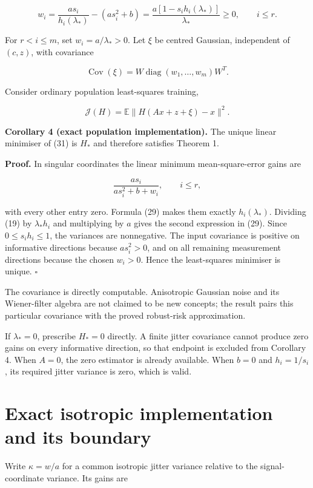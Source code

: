\documentclass[11pt,a4paper]{article}
\begin{document}
\[
w_i=\frac{a s_i}{h_i(\lambda_*)}-(a s_i^2+b)
=\frac{a[1-s_i h_i(\lambda_*)]}{\lambda_*}\ge0,
\qquad i\le r.
\tag{29}
\]

For \(r<i\le m\), set \(w_i=a/\lambda_*>0\). Let \(\xi\) be centred
Gaussian, independent of \((c,z)\), with covariance

\[
\operatorname{Cov}(\xi)=
W\operatorname{diag}(w_1,\ldots,w_m)W^T.
\tag{30}
\]

Consider ordinary population least-squares training,

\[
\mathcal J(H)=\mathbb E\|H(Ax+z+\xi)-x\|^2.
\tag{31}
\]

\textbf{Corollary 4 (exact population implementation).} The unique
linear minimiser of (31) is \(H_*\) and therefore satisfies Theorem 1.

\textbf{Proof.} In singular coordinates the linear minimum
mean-square-error gains are

\[
\frac{a s_i}{a s_i^2+b+w_i},\qquad i\le r,
\]

with every other entry zero. Formula (29) makes them exactly
\(h_i(\lambda_*)\). Dividing (19) by \(\lambda_*h_i\) and multiplying by
\(a\) gives the second expression in (29). Since \(0\le s_i h_i\le1\),
the variances are nonnegative. The input covariance is positive on
informative directions because \(a s_i^2>0\), and on all remaining
measurement directions because the chosen \(w_i>0\). Hence the
least-squares minimiser is unique. \(\square\)

The covariance is directly computable. Anisotropic Gaussian noise and
its Wiener-filter algebra are not claimed to be new concepts; the result
pairs this particular covariance with the proved robust-risk
approximation.

If \(\lambda_*=0\), prescribe \(H_*=0\) directly. A finite jitter
covariance cannot produce zero gains on every informative direction, so
that endpoint is excluded from Corollary 4. When \(A=0\), the zero
estimator is already available. When \(b=0\) and \(h_i=1/s_i\), its
required jitter variance is zero, which is valid.

\hypertarget{exact-isotropic-implementation-and-its-boundary}{%
\section{Exact isotropic implementation and its
boundary}\label{exact-isotropic-implementation-and-its-boundary}}

Write \(\kappa=w/a\) for a common isotropic jitter variance relative to
the signal-coordinate variance. Its gains are
\end{document}
